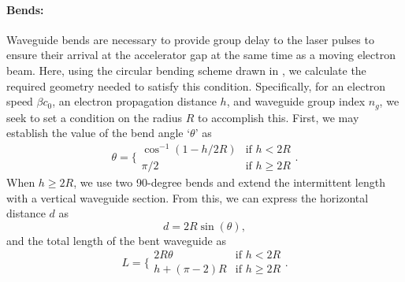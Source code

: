 \paragraph{Bends:}

Waveguide bends are necessary to provide group delay to the laser pulses to ensure their arrival at the accelerator gap at the same time as a moving electron beam.
Here, using the circular bending scheme drawn in , we calculate the required geometry  needed to satisfy this condition.
Specifically, for an electron speed $\beta c_0$, an electron propagation distance $h$, and waveguide group index $n_g$, we seek to set a condition on the radius $R$ to accomplish this.  First, we may establish the value of the bend angle `$\theta$' as
\begin{equation}
    \theta = \Bigg\{
 \begin{array}{ll}
  \cos^{-1}(1-h/2R) &\text{if } h < 2R \\
  \pi/2   &\text{if } h \geq 2R
 \end{array}.
\end{equation}
When $h \geq 2R$, we use two 90-degree bends and extend the intermittent length with a vertical waveguide section.
From this, we can express the horizontal distance $d$ as
\begin{equation}
    d = 2R\sin(\theta),
\end{equation}
and the total length of the bent waveguide as
\begin{equation}
    L = \Bigg\{
 \begin{array}{ll}
  2R\theta    &\text{if } h < 2R \\
  h + (\pi-2)R    &\text{if } h \geq 2R
 \end{array}.
\end{equation}


